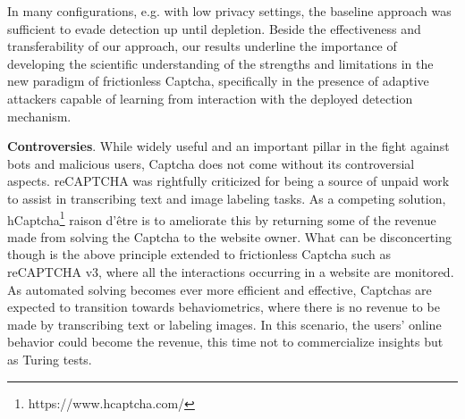 In many configurations, e.g. with low privacy settings, the baseline approach was sufficient to evade detection up until depletion.
Beside the effectiveness and transferability of our approach, our results underline the importance of developing the scientific understanding of the strengths and limitations in the new paradigm of frictionless Captcha, specifically in the presence of adaptive attackers capable of learning from interaction with the deployed detection mechanism.

\textbf{Controversies}. While widely useful and an important pillar in the fight against bots and malicious users, Captcha does not come without its controversial aspects.
reCAPTCHA was rightfully criticized for being a source of unpaid work to assist in transcribing text and image labeling tasks.
As a competing solution, hCaptcha\footnote{https://www.hcaptcha.com/} raison d'être is to ameliorate this by returning some of the revenue made from solving the Captcha to the website owner.
What can be disconcerting though is the above principle extended to frictionless Captcha such as reCAPTCHA v3, where all the interactions occurring in a website are monitored.
As automated solving becomes ever more efficient and effective, Captchas are expected to transition towards behaviometrics, where there is no revenue to be made by transcribing text or labeling images.
In this scenario, the users' online behavior could become the revenue, this time not to commercialize insights but as Turing tests.

